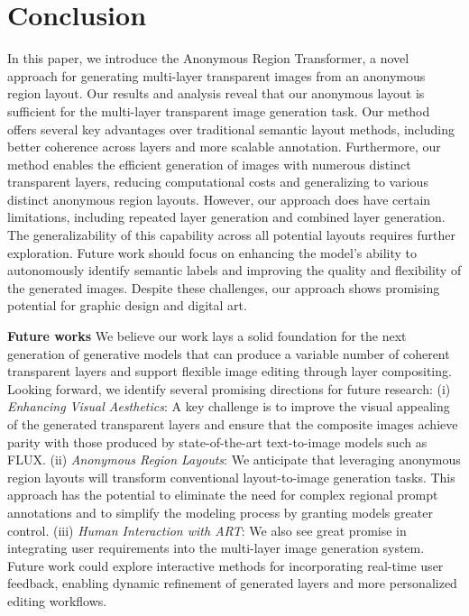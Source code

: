 \vspace{-5pt}
\section{Conclusion}
\label{sec:conclusion}

In this paper, we introduce the Anonymous Region Transformer, a novel approach for generating multi-layer transparent images from an anonymous region layout. Our results and analysis reveal that our anonymous layout is sufficient for the multi-layer transparent image generation task. Our method offers several key advantages over traditional semantic layout methods, including better coherence across layers and more scalable annotation. Furthermore, our method enables the efficient generation of images with numerous distinct transparent layers, reducing computational costs and generalizing to various distinct anonymous region layouts. However, our approach does have certain limitations, including repeated layer generation and combined layer generation. The generalizability of this capability across all potential layouts requires further exploration. Future work should focus on enhancing the model's ability to autonomously identify semantic labels and improving the quality and flexibility of the generated images. Despite these challenges, our approach shows promising potential for graphic design and digital art.

\vspace{1mm}
\noindent\textbf{Future works}
We believe our work lays a solid foundation for the next generation of generative models that can produce a variable number of coherent transparent layers and support flexible image editing through layer compositing. Looking forward, we identify several promising directions for future research:
(i) \emph{Enhancing Visual Aesthetics}:
A key challenge is to improve the visual appealing of the generated transparent layers and ensure that the composite images achieve parity with those produced by state-of-the-art text-to-image models such as FLUX.
(ii) \emph{Anonymous Region Layouts}:
We anticipate that leveraging anonymous region layouts will transform conventional layout-to-image generation tasks. This approach has the potential to eliminate the need for complex regional prompt annotations and to simplify the modeling process by granting models greater control.
(iii) \emph{Human Interaction with ART}:
We also see great promise in integrating user requirements into the multi-layer image generation system. Future work could explore interactive methods for incorporating real-time user feedback, enabling dynamic refinement of generated layers and more personalized editing workflows.